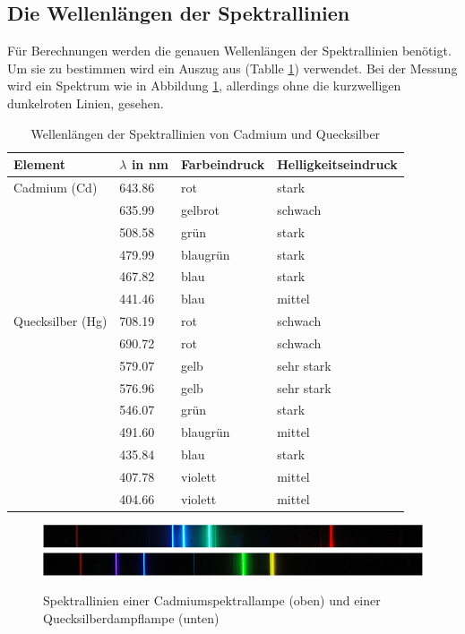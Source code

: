 \subsection{Die Wellenlängen der Spektrallinien}
Für Berechnungen werden die genauen Wellenlängen der Spektrallinien benötigt. Um sie zu bestimmen wird ein Auszug aus \cite[Tabellenanhang Tab. A 4.3]{Walcher} (Tablle \ref{tab:Wellenlange}) verwendet. Bei der Messung wird ein Spektrum wie in Abbildung \ref{abb:Spektrum}, allerdings ohne die kurzwelligen dunkelroten Linien, gesehen.
\begin{table}[h!]
	\centering
	\begin{tabular}{llll}
		Element & $\lambda$ in \si{\nano\meter} & Farbeindruck & Helligkeitseindruck\footnotemark \\
		\hline
		Cadmium (Cd) & 643.86 & rot & stark \\
		& 635.99 & gelbrot & schwach \\
		& 508.58 & grün & stark \\
		& 479.99 & blaugrün & stark \\
		& 467.82 & blau & stark \\
		& 441.46 & blau & mittel \\
		\hline
		Quecksilber (Hg) & 708.19 & rot & schwach \\
		& 690.72 & rot & schwach \\
		& 579.07 & gelb & sehr stark \\
		& 576.96 & gelb & sehr stark \\
		& 546.07 & grün & stark \\
		& 491.60 & blaugrün & mittel \\
		& 435.84 & blau & stark \\
		& 407.78 & violett & mittel \\
		& 404.66 & violett & mittel \\
		\hline
	\end{tabular}
	\caption{Wellenlängen der Spektrallinien von Cadmium und Quecksilber}
	\label{tab:Wellenlange}
\end{table}
\begin{figure}[h!]
	\centering
	\includegraphics[width = \textwidth]{Cd.jpg}
	\includegraphics[width = \textwidth]{Hg.jpg}
	\caption{Spektrallinien einer Cadmiumspektrallampe\cite{Cadmium} (oben) und einer Quecksilberdampflampe\cite{Quecksilber} (unten)}
	\label{abb:Spektrum}
\end{figure}\newline
